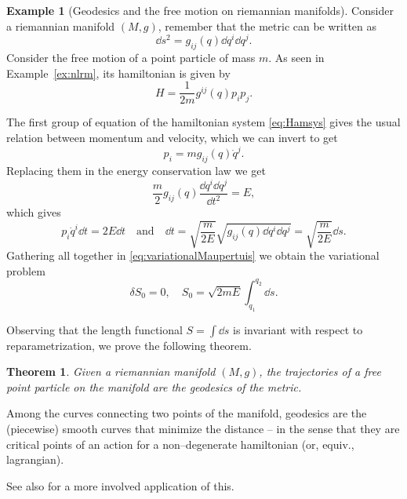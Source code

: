 \documentclass[english,fontsize=11pt,paper=b5]{scrbook}
\numberwithin{equation}{chapter}
\newtheorem{theorem}{Theorem}[chapter]
\theoremstyle{definition}
\newtheorem{example}{Example}[chapter]
\begin{document}
    \begin{example}[Geodesics and the free motion on riemannian manifolds]
      Consider a riemannian manifold $(M, g)$, remember that the metric  can be written as
      \begin{equation}
        \dd s^2 = g_{ij}(q)\dd q^i \dd q^j.
      \end{equation}
      Consider the free motion of a point particle of mass $m$. As seen in Example~\ref{ex:nlrm}, its hamiltonian is given by
      \begin{equation}
        H = \frac1{2m} g^{ij}(q) p_i p_j.
      \end{equation}

      The first group of equation of the hamiltonian system \eqref{eq:Hamsys} gives the usual relation between momentum and velocity, which we can invert to get
      \begin{equation}
        p_i = m g_{ij}(q)\dot q^j.
      \end{equation}
      Replacing them in the energy conservation law we get
      \begin{equation}
        \frac m2 g_{ij}(q)\frac{\dd q^i \dd q^j}{\dd t^2} = E,
      \end{equation}
      which gives
      \begin{equation}
        p_i\dot q^i \dd t= 2E \dd t
        \quad\mbox{and}\quad
        \dd t = \sqrt{\frac{m}{2E}}\sqrt{g_{ij}(q)\dd q^i \dd q^j} = \sqrt{\frac{m}{2E}} \dd s.
      \end{equation}
      Gathering all together in \eqref{eq:variationalMaupertuis} we obtain the variational problem
      \begin{equation}
        \delta S_0 = 0, \quad S_0 = \sqrt{2mE}\int_{q_1}^{q_2} \dd s.
      \end{equation}

      Observing that the length functional $S = \int \dd s$ is invariant with respect to reparametrization, we prove the following theorem.
      \begin{theorem}
        Given a riemannian manifold $(M,g)$, the trajectories of a free point particle on the manifold are the geodesics of the metric.
      \end{theorem}

      Among the curves connecting two points of the manifold, geodesics are the (piecewise) smooth curves that minimize the distance -- in the sense that they are critical points of an action for a non--degenerate hamiltonian (or, equiv., lagrangian).

      See also \cite{Bolsinov_1995} for a more involved application of this.
    \end{example}
\end{document}
